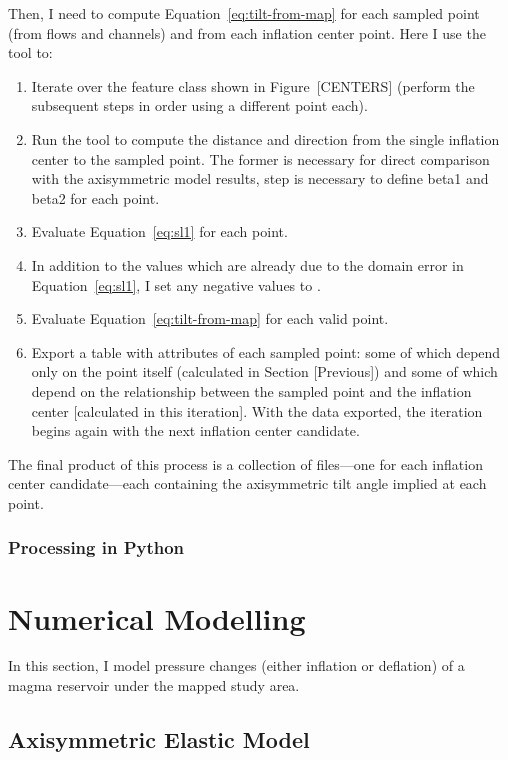 Then, I need to compute Equation~\eqref{eq:tilt-from-map} for each sampled point (from flows and channels) and from each inflation center point. Here I use the  tool to:
\begin{enumerate}
    \item Iterate over the feature class shown in Figure~[CENTERS] (perform the subsequent steps in order using a different point each).
    \item Run the  tool to compute the distance and direction from the single inflation center to the sampled point. The former is necessary for direct comparison with the axisymmetric model results, step is necessary to define \acs{beta1} and \acs{beta2} for each point.
    \item Evaluate Equation~\eqref{eq:sl1} for each point.
    \item In addition to the values which are already  due to the domain error in Equation~\eqref{eq:sl1}, I set any negative values to .
    \item Evaluate Equation~\eqref{eq:tilt-from-map} for each valid point.
    \item Export a table with attributes of each sampled point: some of which depend only on the point itself (calculated in Section [Previous]) and some of which depend on the relationship between the sampled point and the inflation center [calculated in this iteration]. With the data exported, the iteration begins again with the next inflation center candidate.
\end{enumerate}
The final product of this process is a collection of  files---one for each inflation center candidate---each containing the axisymmetric tilt angle implied at each point. 

\subsubsection{Processing in Python}


\section{Numerical Modelling}\label{sec:modelling}

In this section, I model pressure changes (either inflation or deflation) of a magma reservoir under the mapped study area.

\subsection{Axisymmetric Elastic Model}

